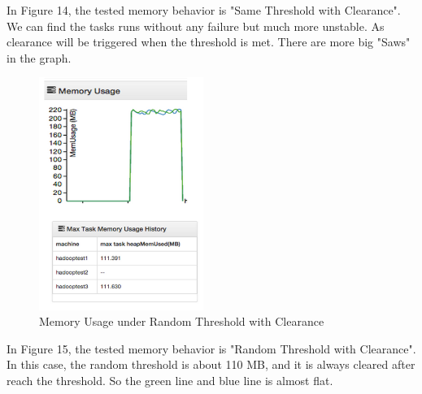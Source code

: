 In Figure 14, the tested memory behavior is "Same Threshold with Clearance". We can find the tasks runs without any failure but much more unstable. As clearance will be triggered when the threshold is met. There are more big "Saws" in the graph.

\begin{figure}[ht]
  \centering
    \includegraphics[width=2.1in]{image/test1d.png}
    \caption{Memory Usage under Random Threshold with Clearance}
    \label{ref:memory_allocation}
\end{figure}

In Figure 15, the tested memory behavior is "Random Threshold with Clearance". In this case, the random threshold is about 110 MB, and it is always cleared after reach the threshold. So the green line and blue line is almost flat.
